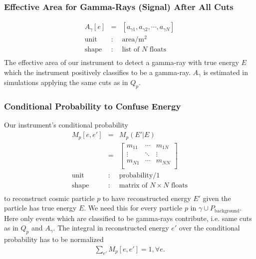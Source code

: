 \documentclass{article}%
\begin{document}
        \subsubsection*{Effective Area for Gamma-Rays (Signal) After All Cuts}
            \begin{eqnarray*}
                A_\gamma[e] &=& [a_{\gamma 1}, a_{\gamma 2}, \cdots, a_{\gamma N}]\\
                \text{unit} &:& \text{area} / \text{m}^{2}\\
                \text{shape} &:& \text{list of}\,\,N\,\,\text{floats}\\
            \end{eqnarray*}
            The effective area of our instrument to detect a gamma-ray with true energy $E$ which the instrument positively classifies to be a gamma-ray.
            $A_\gamma$ is estimated in simulations applying the same cuts as in $Q_p$.
        \subsubsection*{Conditional Probability to Confuse Energy}
            Our instrument's conditional probability
            \begin{eqnarray*}
                M_p[e, e'] &=& M_p(E' \vert E)\\
                &=&
                  \left[ {\begin{array}{ccc}
                    m_{11} & \cdots & m_{1N}\\
                    \vdots & \ddots & \vdots\\
                    m_{N1} & \cdots & m_{NN}\\
                  \end{array} } \right]\\
                \text{unit} &:& \text{probability}/1\\
                \text{shape} &:& \text{matrix of}\,\,N \times N \,\,\text{floats}\\
            \end{eqnarray*}
            to reconstruct cosmic particle $p$ to have reconstructed energy $E'$ given the particle has true energy $E$.
            We need this for every particle $p$ in $\gamma \cup P_\text{background}$.
            Here only events which are classified to be gamma-rays contribute, i.e. same cuts as in $Q_p$ and $A_\gamma$.
            The integral in reconstructed energy $e'$ over the conditional probability has to be normalized
            \begin{eqnarray*}
                \sum_{e'} M_p[e, e'] = 1, \forall e.
            \end{eqnarray*}
\end{document}

